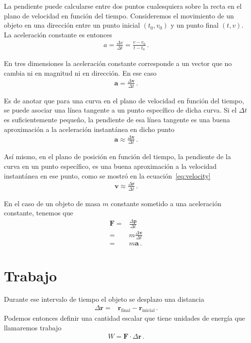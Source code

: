 \documentclass[11pt,a4paper]{book}
\begin{document}
La pendiente puede calcularse entre dos puntos cualesquiera sobre la recta en el plano de velocidad en función del tiempo. Consideremos el movimiento de un objeto en una dirección entre un punto inicial $(t_0,v_0)$ y un punto final $(t,v)$. La aceleración constante es entonces
\begin{align}
    a =\frac{\Delta v}{\Delta t} =\frac{v-v_0}{t-t_0}\,.
\end{align}

En tres dimensiones la aceleración constante corresponde a un vector que no cambia ni en magnitud ni en dirección. En ese caso
\begin{align}
\label{eq:aceleración}
    \boldsymbol{a} = \frac{\Delta \boldsymbol{v}}{\Delta t}\,.
\end{align}

Es de anotar que para una curva en el plano de velocidad en función del tiempo, se puede asociar una línea tangente a un punto específico de dicha curva. Si el $\Delta t$ es suficientemente pequeño, la pendiente de esa línea tangente es una buena aproximación a la aceleración instantánea en dicho punto
\begin{align*}
    \boldsymbol{a} \approx \frac{\Delta \boldsymbol{v}}{\Delta t}\,.
\end{align*}

Así mismo, en el plano de posición en función del tiempo, la pendiente de la curva en un punto específico, es una buena aproximación a la velocidad instantánea en ese punto, como se mostró en la ecuación~\eqref{eq:velocity}
\begin{align*}
    \boldsymbol{v} \approx \frac{\Delta \boldsymbol{r}}{\Delta t}\,.
\end{align*}

En el caso de un objeto de masa $m$ constante sometido a una aceleración constante, tenemos que
\begin{align}
\label{eq:F=ma}
    \boldsymbol{F}=&\frac{\Delta\boldsymbol{p}}{\Delta t}\nonumber\\
    =&m\frac{\Delta\boldsymbol{v}}{\Delta t}\nonumber\\
    =& m\boldsymbol{a}\,.
\end{align}

\section{Trabajo}
Durante ese intervalo de tiempo el objeto se desplazo una distancia
\begin{align}
    \Delta\boldsymbol{r} =& \boldsymbol{r}_{\text{final}}
    - \boldsymbol{r}_{\text{inicial}}\,.      
\end{align}
Podemos entonces definir una cantidad escalar que tiene unidades de energía que llamaremos trabajo
\begin{align}
    W = \boldsymbol{F}\cdot \Delta\boldsymbol{r}\,.
\end{align}
\end{document}
